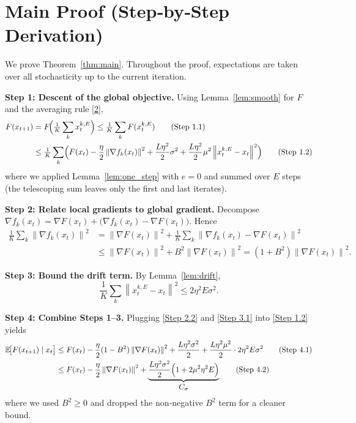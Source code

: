 \documentclass{article}
\newcommand{\E}{\mathbb{E}}
\newcommand{\norm}[1]{\left\lVert#1\right\rVert}
\begin{document}
\section*{Main Proof (Step‑by‑Step Derivation)}
We prove Theorem~\ref{thm:main}. Throughout the proof, expectations are taken over all stochasticity up to the current iteration.

\noindent\textbf{Step 1: Descent of the global objective.}  
Using Lemma~\ref{lem:smooth} for $F$ and the averaging rule \eqref{2},
\[
\begin{aligned}
F(x_{t+1})
&=F\!\Bigl(\tfrac{1}{K}\sum_{k}x_{t}^{k,E}\Bigr)
 \le \tfrac{1}{K}\sum_{k}F(x_{t}^{k,E})                                   \tag{Step 1.1}\\
&\le \tfrac{1}{K}\sum_{k}\Bigl(F(x_t)
      -\frac{\eta}{2}\norm{\nabla f_k(x_t)}^{2}
      +\frac{L\eta^{2}}{2}\sigma^{2}
      +\frac{L\eta^{2}}{2}\mu^{2}\norm{x_{t}^{k,E}-x_t}^{2}
   \Bigr)                                                                   \tag{Step 1.2}
\end{aligned}
\]
where we applied Lemma~\ref{lem:one_step} with $e=0$ and summed over $E$ steps (the telescoping sum leaves only the first and last iterates).

\noindent\textbf{Step 2: Relate local gradients to global gradient.}  
Decompose $\nabla f_k(x_t)=\nabla F(x_t)+\bigl(\nabla f_k(x_t)-\nabla F(x_t)\bigr)$. Hence
\[
\begin{aligned}
\frac{1}{K}\sum_{k}\norm{\nabla f_k(x_t)}^{2}
&= \norm{\nabla F(x_t)}^{2}
   +\frac{1}{K}\sum_{k}\norm{\nabla f_k(x_t)-\nabla F(x_t)}^{2} \tag{Step 2.1}\\
&\le \norm{\nabla F(x_t)}^{2}+B^{2}\norm{\nabla F(x_t)}^{2}
   = (1+B^{2})\norm{\nabla F(x_t)}^{2} .                                   \tag{Step 2.2}
\end{aligned}
\]

\noindent\textbf{Step 3: Bound the drift term.}  
By Lemma~\ref{lem:drift},
\[
\frac{1}{K}\sum_{k}\norm{x_{t}^{k,E}-x_t}^{2}
\le 2\eta^{2}E\sigma^{2}.                                                   \tag{Step 3.1}
\]

\noindent\textbf{Step 4: Combine Steps 1–3.}
Plugging \eqref{Step 2.2} and \eqref{Step 3.1} into \eqref{Step 1.2} yields
\[
\begin{aligned}
\E\!\bigl[F(x_{t+1})\mid x_t\bigr]
&\le F(x_t)
   -\frac{\eta}{2}(1-B^{2})\norm{\nabla F(x_t)}^{2}
   +\frac{L\eta^{2}\sigma^{2}}{2}
   +\frac{L\eta^{2}\mu^{2}}{2}\cdot 2\eta^{2}E\sigma^{2}                \tag{Step 4.1}\\
&\le F(x_t)
   -\frac{\eta}{2}\norm{\nabla F(x_t)}^{2}
   +\underbrace{\frac{L\eta^{2}\sigma^{2}}{2}\Bigl(1+2\mu^{2}\eta^{2}E\Bigr)}_{\displaystyle C_{\sigma}}   \tag{Step 4.2}
\end{aligned}
\]
where we used $B^{2}\ge0$ and dropped the non‑negative $B^{2}$ term for a cleaner bound.
\end{document}
